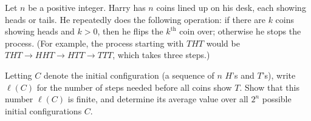 Let $n$ be a positive integer. Harry has $n$ coins lined up on his desk, each showing heads or tails. He repeatedly does the following operation: if there are $k$ coins showing heads and $k > 0$, then he flips the $k^{\text{th}}$ coin over; otherwise he stops the process. (For example, the process starting with $THT$ would be $THT \to HHT \to HTT \to TTT$, which takes three steps.)

Letting $C$ denote the initial configuration (a sequence of $n$ $H$'s and $T$'s), write $\ell(C)$ for the number of steps needed before all coins show $T$. Show that this number $\ell(C)$ is finite, and determine its average value over all $2^n$ possible initial configurations $C$.
